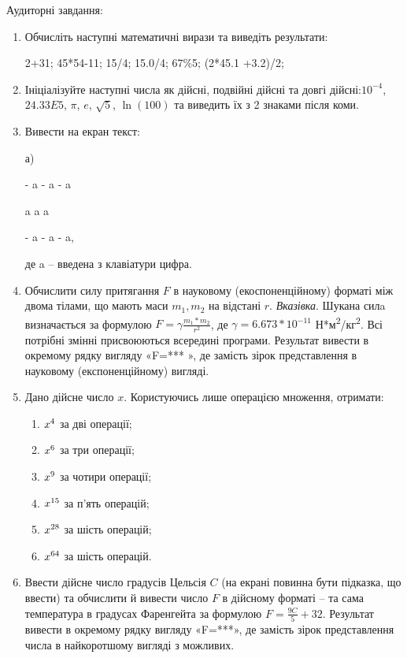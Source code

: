 \documentclass[]{article}
\makeatletter
\newcommand{\xslalph}[1]{\expandafter\@xslalph\csname c@#1\endcsname}
\newcommand{\@xslalph}[1]{%
    \ifcase#1\or а\or б\or в\or г\or д\or e\or є\or ж\or з\or i%
    \or й\or к\or л\or м\or н\or о\or п\or р\or с\or т%
    \or у\or ф\or х\or ц\or ч\or ш\or ю\or я\or аа\or бб\or вв %
    \else\@ctrerr\fi%
}
\makeatother
\begin{document}
Аудиторні завдання:

\begin{enumerate}
\def\labelenumi{\arabic{enumi}.}
\item
  Обчисліть наступні математичні вирази та виведіть результати:

2+31; 45*54-11; 15/4; 15.0/4; 67\%5; (2*45.1 +3.2)/2;

\item
  Ініціалізуйте наступні числа як дійсні, подвійні дійсні та довгі
  дійсні:$10^{-4}$, $24.33E5$, $\pi$, $e$, $\sqrt{5}$,
  $\ln(100)$ та виведить їх з 2 знаками після коми.

\item
  Вивести на екран текст:

а) 

-\/ a -\/ a -\/ a

a \textbar{} a \textbar{} a

-\/ a -\/ a -\/ a,

де a -- введена з клавіатури цифра.

\item
  Обчислити силу притягання $F$ в науковому (екоспоненційному) форматі між двома тілами,
  що мають маси $m_{1},m_{2}$ на відстані $r$. 
  \emph{\emph{Вказівка}}. Шукана силa визначається за формулою 
  $ F=\gamma \frac{m_{1}*m_{2}}{r^{2}}$,
  де $\gamma = 6.673*10^{-11}$ Н*м\textsuperscript{2}/кг\textsuperscript{2}. Всі потрібні змінні
  присвоюються всередині програми. Результат вивести в окремому рядку
  вигляду «F=*** », де замість зірок представлення в науковому
  (експоненційному) вигляді.

\item
  Дано дійсне число \(x\). Користуючись лише операцією множення,
  отримати:
  \begin{enumerate}[label=\xslalph*)]
  \item  \(x\textsuperscript{4}\) за дві операції; 
  \item  \(x\textsuperscript{6}\) за три операції;
  \item \(x\textsuperscript{9}\) за чотири операції; 
  \item \(x\textsuperscript{15}\) за п'ять операцій;
  \item \(x\textsuperscript{28}\) за шість операцій; 
  \item \(x\textsuperscript{64}\) за шість операцій.
  \end{enumerate}

\item
  Ввести дійсне число градусів Цельсія $C$ (на екрані повинна бути
  підказка, що ввести) та обчислити й вивести число $F$ в дійсному форматі
  -- та сама температура в градусах Фаренгейта за формулою $F = \frac{9C}{5} + 32 $.
 Результат вивести в окремому рядку вигляду «F=***», де замість зірок представлення числа в найкоротшому вигляді
  з можливих.


\end{enumerate}
\end{document}
